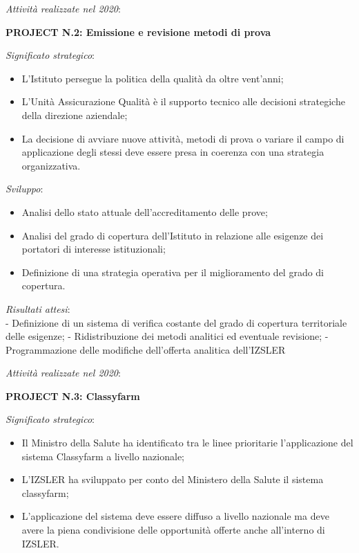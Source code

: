 \documentclass[
  12pt,
]{article}
\providecommand{\tightlist}{%
  \setlength{\itemsep}{0pt}\setlength{\parskip}{0pt}}
\begin{document}
\emph{Attività realizzate nel 2020}:

\textbf{PROJECT N.2: Emissione e revisione metodi di prova}

\emph{Significato strategico}:

\begin{itemize}
\tightlist
\item
  L'Istituto persegue la politica della qualità da oltre vent'anni;
\item
  L'Unità Assicurazione Qualità è il supporto tecnico alle decisioni
  strategiche della direzione aziendale;
\item
  La decisione di avviare nuove attività, metodi di prova o variare il
  campo di applicazione degli stessi deve essere presa in coerenza con
  una strategia organizzativa.
\end{itemize}

\emph{Sviluppo}:

\begin{itemize}
\tightlist
\item
  Analisi dello stato attuale dell'accreditamento delle prove;
\item
  Analisi del grado di copertura dell'Istituto in relazione alle
  esigenze dei portatori di interesse istituzionali;
\item
  Definizione di una strategia operativa per il miglioramento del grado
  di copertura.
\end{itemize}

\emph{Risultati attesi}:\\
- Definizione di un sistema di verifica costante del grado di copertura
territoriale delle esigenze; - Ridistribuzione dei metodi analitici ed
eventuale revisione; - Programmazione delle modifiche dell'offerta
analitica dell'IZSLER

\emph{Attività realizzate nel 2020}:

\textbf{PROJECT N.3: Classyfarm}

\emph{Significato strategico}:

\begin{itemize}
\tightlist
\item
  Il Ministro della Salute ha identificato tra le linee prioritarie
  l'applicazione del sistema Classyfarm a livello nazionale;
\item
  L'IZSLER ha sviluppato per conto del Ministero della Salute il sistema
  classyfarm;
\item
  L'applicazione del sistema deve essere diffuso a livello nazionale ma
  deve avere la piena condivisione delle opportunità offerte anche
  all'interno di IZSLER.
\end{itemize}
\end{document}
